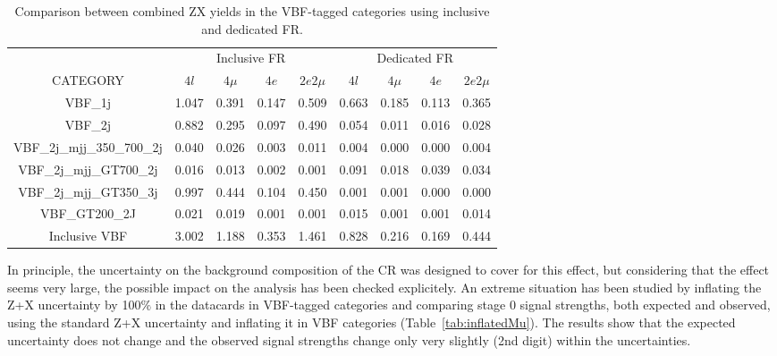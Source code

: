 \begin{table}[!h]
        \begin{center}
                \caption{
                Comparison between combined ZX yields in the VBF-tagged categories using inclusive and dedicated FR. 
                \label{tab:VBFyields}
                        }
    \renewcommand{\arraystretch}{1.5}
    \begin{tabular}{c|cccc|cccc}
        & \multicolumn{4}{c|}{Inclusive FR} & \multicolumn{4}{c}{Dedicated FR} \\
        CATEGORY                   & $4l$  & $4\mu$ & $4e$ & $2e2\mu$  & $4l$ & $4\mu$ & $4e$ & $2e2\mu$ \\
        \hline
        VBF\_1j                     & 1.047 & 0.391 & 0.147 & 0.509    & 0.663 & 0.185 & 0.113 & 0.365  \\
        VBF\_2j                     & 0.882 & 0.295 & 0.097 & 0.490    & 0.054 & 0.011 & 0.016 & 0.028  \\
        VBF\_2j\_mjj\_350\_700\_2j  & 0.040 & 0.026 & 0.003 & 0.011    & 0.004 & 0.000 & 0.000 & 0.004  \\
        VBF\_2j\_mjj\_GT700\_2j     & 0.016 & 0.013 & 0.002 & 0.001    & 0.091 & 0.018 & 0.039 & 0.034  \\
        VBF\_2j\_mjj\_GT350\_3j     & 0.997 & 0.444 & 0.104 & 0.450    & 0.001 & 0.001 & 0.000 & 0.000  \\
        VBF\_GT200\_2J              & 0.021 & 0.019 & 0.001 & 0.001    & 0.015 & 0.001 & 0.001 & 0.014  \\
        \hline                      
        Inclusive VBF               & 3.002 & 1.188 & 0.353 & 1.461    & 0.828 & 0.216 & 0.169 & 0.444  \\
        \hline


\end{tabular}
        \end{center}
\end{table}

In principle, the uncertainty on the background composition of the CR was designed to cover for this effect, but considering that the effect seems very large, 
the possible impact on the analysis has been checked explicitely. 
An extreme situation has been studied by inflating the Z+X uncertainty by 100$\%$ in the datacards in VBF-tagged categories and comparing stage 0 signal strengths, 
both expected and observed, using the standard Z+X uncertainty and inflating it in VBF categories (Table~\ref{tab:inflatedMu}). 
The results show that the expected uncertainty does not change and the observed signal strengths change only very slightly (2nd digit) within the uncertainties. 

